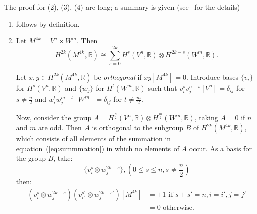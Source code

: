 \documentclass{book}
\newenvironment{Proof}[1][]
  {\begin{ProofTcb}[#1]}
  {\end{ProofTcb}}
\newcommand{\R}{{\mathbb{R}}}
\begin{document}
\begin{Proof}
  The proof for (2), (3), (4) are long; a summary is given
(see~\cite{thomQuelquesProprietesGlobales1964} for the details)
\begin{enumerate}
  \item follows by definition.

  \item Let $M^{4k} = V^n \times W^m$. Then
    \begin{equation}\label{eq:summmation}
    H^{2k}(M^{4k}, \R) \cong \sum_{s=0}^{2k} H^s(V^n, \R) \otimes H^{2k-s}(W^m, \R).
\end{equation}

 Let $x, y \in H^{2k}(M^{4k}, \R)$ be \emph{orthogonal} if $x y[M^{4k}] = 0$. Introduce bases $\{v_i\}$ for
 $H^s(V^n, \R)$ and $\{w_j\}$ for $H^t(W^m, \R)$ such that $v_i^s v_j^{n-s}[V^n] = \delta_{ij}$ for $s \neq
 \frac{n}{2}$ and $w_i^t w_j^{m-t}[W^m] = \delta_{ij}$ for $t \neq \frac{m}{2}$.

Now, consider the group $A = H^{\frac{n}{2}}(V^n, \R) \otimes H^{\frac{m}{2}}(W^m, \R)$, taking $A = 0$ if $n$
and $m$ are odd. Then $A$ is orthogonal to the subgroup $B$ of $H^{2k}(M^{4k}, \R)$, which consists of all
elements of the summation in equation~(\ref{eq:summmation}) in which no elements of $A$ occur. As a basis for
the group $B$, take:
\[
  \{v_i^s \otimes w_j^{2k-s}\}, (0 \leq s \leq n, s \neq \frac{n}{2})
\]
then:
\begin{align*}
(v_i^s \otimes w_j^{2k-s})(v_{i'}^{s'} \otimes w_{j'}^{2k-s'})[M^{4k}] &= \pm 1 \text{ if } s + s' = n, i = i', j = j' \\
&= 0 \text{ otherwise.}
\end{align*}


\end{enumerate}
\end{Proof}
\end{document}
